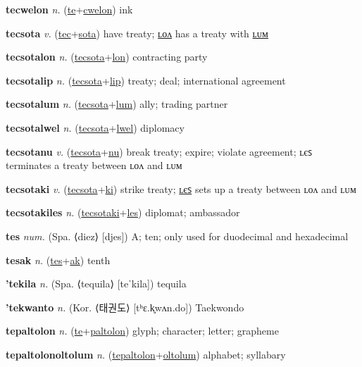 \textbf{\hypertarget{tecwelon}{tecwelon}} \textit{n.} (\hyperlink{te}{te}+\allowbreak \hyperlink{cwelon}{cwelon})
ink

\textbf{\hypertarget{tecsota}{tecsota}} \textit{v.} (\hyperlink{tec}{tec}+\allowbreak \hyperlink{sota}{sota})
have treaty; \hyperlink{tecsotalon}{ʟᴏᴧ} has a treaty with \hyperlink{tecsotalum}{ʟᴜᴍ}

\textbf{\hypertarget{tecsotalon}{tecsotalon}} \textit{n.} (\hyperlink{tecsota}{tecsota}+\allowbreak \hyperlink{lon}{lon})
contracting party

\textbf{\hypertarget{tecsotalip}{tecsotalip}} \textit{n.} (\hyperlink{tecsota}{tecsota}+\allowbreak \hyperlink{lip}{lip})
treaty; deal; international agreement

\textbf{\hypertarget{tecsotalum}{tecsotalum}} \textit{n.} (\hyperlink{tecsota}{tecsota}+\allowbreak \hyperlink{lum}{lum})
ally; trading partner

\textbf{\hypertarget{tecsotalwel}{tecsotalwel}} \textit{n.} (\hyperlink{tecsota}{tecsota}+\allowbreak \hyperlink{lwel}{lwel})
diplomacy

\textbf{\hypertarget{tecsotanu}{tecsotanu}} \textit{v.} (\hyperlink{tecsota}{tecsota}+\allowbreak \hyperlink{nu}{nu})
break treaty; expire; violate agreement; ʟєꜱ terminates a treaty between ʟᴏᴧ and ʟᴜᴍ

\textbf{\hypertarget{tecsotaki}{tecsotaki}} \textit{v.} (\hyperlink{tecsota}{tecsota}+\allowbreak \hyperlink{ki}{ki})
strike treaty; \hyperlink{tecsotakiles}{ʟєꜱ} sets up a treaty between ʟᴏᴧ and ʟᴜᴍ

\textbf{\hypertarget{tecsotakiles}{tecsotakiles}} \textit{n.} (\hyperlink{tecsotaki}{tecsotaki}+\allowbreak \hyperlink{les}{les})
diplomat; ambassador

\textbf{\hypertarget{tes}{tes}} \textit{num.} (Spa. ⟨diez⟩ [djes])
A; ten; only used for duodecimal and hexadecimal

\textbf{\hypertarget{tesak}{tesak}} \textit{n.} (\hyperlink{tes}{tes}+\allowbreak \hyperlink{ak}{ak})
tenth

\textbf{\hypertarget{'tekila}{'tekila}} \textit{n.} (Spa. ⟨tequila⟩ [teˈkila])
tequila

\textbf{\hypertarget{'tekwanto}{'tekwanto}} \textit{n.} (Kor. ⟨{\korean{}태권도}⟩ [tʰɛ.k͈wʌn.do])
Taekwondo

\textbf{\hypertarget{tepaltolon}{tepaltolon}} \textit{n.} (\hyperlink{te}{te}+\allowbreak \hyperlink{paltolon}{paltolon})
glyph; character; letter; grapheme

\textbf{\hypertarget{tepaltolonoltolum}{tepaltolonoltolum}} \textit{n.} (\hyperlink{tepaltolon}{tepaltolon}+\allowbreak \hyperlink{oltolum}{oltolum})
alphabet; syllabary

